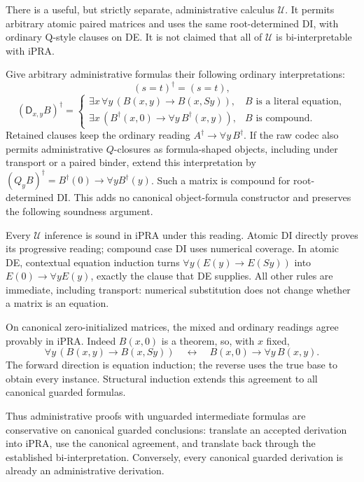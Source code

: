 There is a useful, but strictly separate, administrative calculus
$\mathcal U$.  It permits arbitrary atomic paired matrices and uses
the same root-determined DI, with ordinary Q-style clauses on DE.
It is not claimed that all of $\mathcal U$ is bi-interpretable with iPRA.

Give arbitrary administrative formulas their following ordinary
interpretations:
\[
 (s=t)^\dagger=(s=t),
\]
\[
 (\mathsf D_{x,y}B)^\dagger=
 \begin{cases}
 \exists x\,\forall y\,(B(x,y)\to B(x,Sy)),
       &B\text{ is a literal equation},\\[2pt]
 \exists x\,(B^\dagger(x,0)\to\forall y\,B^\dagger(x,y)),
       &B\text{ is compound}.
 \end{cases}
 \tag{Mixed administrative reading}\label{eq:guarded-mixed}
\]
Retained clauses keep the ordinary reading
$A^\dagger\to\forall y\,B^\dagger$.
If the raw codec also permits administrative $Q$-closures as
formula-shaped objects, including under transport or a paired binder,
extend this interpretation by
$(Q_yB)^\dagger=B^\dagger(0)\to\forall yB^\dagger(y)$.
Such a matrix is compound for root-determined DI.  This adds no
canonical object-formula constructor and preserves the following
soundness argument.

Every $\mathcal U$ inference is sound in iPRA under this reading.
Atomic DI directly proves its progressive reading; compound case DI
uses numerical coverage.  In atomic DE, contextual equation induction
turns $\forall y(E(y)\to E(Sy))$ into
$E(0)\to\forall yE(y)$, exactly the clause that DE supplies.
All other rules are immediate, including transport: numerical
substitution does not change whether a matrix is an equation.

On canonical zero-initialized matrices, the mixed and ordinary readings
agree provably in iPRA.  Indeed $B(x,0)$ is a theorem, so, with $x$ fixed,
\[
 \forall y\,(B(x,y)\to B(x,Sy))
 \quad\longleftrightarrow\quad
 B(x,0)\to\forall y\,B(x,y).
\]
The forward direction is equation induction; the reverse uses the
true base to obtain every instance.  Structural induction extends
this agreement to all canonical guarded formulas.

Thus administrative proofs with unguarded intermediate formulas are
conservative on canonical guarded conclusions: translate an accepted
derivation into iPRA, use the canonical agreement, and translate back
through the established bi-interpretation.  Conversely, every canonical
guarded derivation is already an administrative derivation.

